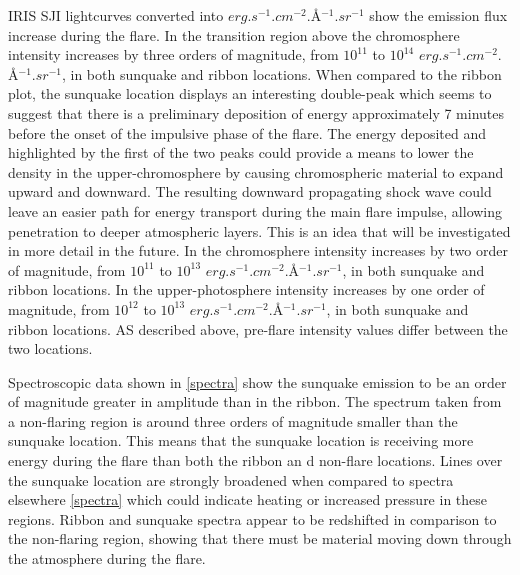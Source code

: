 IRIS SJI lightcurves converted into $erg.s^{-1}.cm^{-2}.$\AA$^{-1}.sr^{-1}$ show the emission flux increase during the flare. In the transition region above the chromosphere intensity increases by three orders of magnitude, from $10^{11}$ to $10^{14}$ $erg.s^{-1}.cm^{-2}.$\AA$^{-1}.sr^{-1}$, in both sunquake and ribbon locations. When compared to the ribbon plot, the sunquake location displays an interesting double-peak which seems to suggest that there is a preliminary deposition of energy approximately 7 minutes before the onset of the impulsive phase of the flare. The energy deposited and highlighted by the first of the two peaks could provide a means to lower the density in the upper-chromosphere by causing chromospheric material to expand upward and downward. The resulting downward propagating shock wave could leave an easier path for energy transport during the main flare impulse, allowing penetration to deeper atmospheric layers. This is an idea that will be investigated in more detail in the future. In the chromosphere intensity increases by two order of magnitude, from $10^{11}$ to $10^{13}$ $erg.s^{-1}.cm^{-2}.$\AA$^{-1}.sr^{-1}$, in both sunquake and ribbon locations. In the upper-photosphere intensity increases by one order of magnitude, from $10^{12}$ to $10^{13}$ $erg.s^{-1}.cm^{-2}.$\AA$^{-1}.sr^{-1}$, in both sunquake and ribbon locations. AS described above, pre-flare intensity values differ between the two locations.

Spectroscopic data shown in \ref{spectra} show the sunquake emission to be an order of magnitude greater in amplitude than in the ribbon. The spectrum taken from a non-flaring region is around three orders of magnitude smaller than the sunquake location. This means that the sunquake location is receiving more energy during the flare than both the ribbon an d non-flare locations. Lines over the sunquake location are strongly broadened when compared to spectra elsewhere \ref{spectra} which could indicate heating or increased pressure in these regions. Ribbon and sunquake spectra appear to be redshifted in comparison to the non-flaring region, showing that there must be material moving down through the atmosphere during the flare.\\


